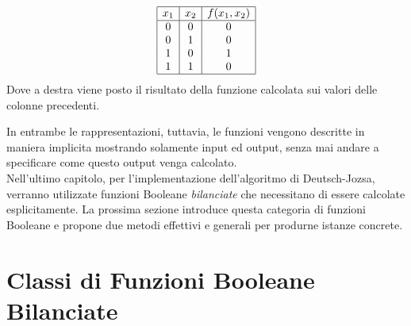 \documentclass[12pt,a4paper,openright]{report}
\begin{document}
\begin{displaymath}
    \begin{array}{|c|c|c|}\hline
        x_1 & x_2 & f(x_1, x_2) \\\hline 
        0   & 0   &  0  \\ 
        0   & 1   &  0  \\
        1   & 0   &  1  \\
        1   & 1   &  0  \\\hline
    \end{array}
\end{displaymath}
Dove a destra viene posto il risultato della funzione calcolata sui valori delle colonne precedenti.\par
In entrambe le rappresentazioni, tuttavia, le funzioni vengono descritte in maniera implicita mostrando solamente input ed output,
senza mai andare a specificare come questo output venga calcolato.\\
Nell'ultimo capitolo, per l'implementazione dell'algoritmo di Deutsch-Jozsa, verranno utilizzate funzioni Booleane \textit{bilanciate}
che necessitano di essere calcolate esplicitamente. La prossima sezione introduce questa categoria di funzioni Booleane e 
propone due metodi effettivi e generali per produrne istanze concrete.

\section{Classi di Funzioni Booleane Bilanciate}
\end{document}
